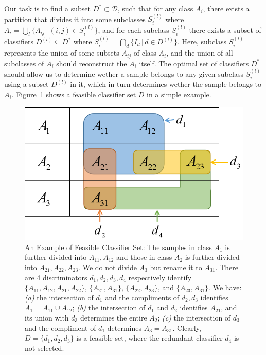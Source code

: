 \documentclass[acmsmall,nonacm]{acmart}\settopmatter{}
\begin{document}
Our task is to find a subset $D^* \subset \mathcal{D}$, such that for any class $A_i$, there exists a partition that divides it into some subclasses $S_i^{(l)}$ where $A_i = \bigcup_l \{A_{ij} \,|\, (i, j) \in S_i^{(l)}\}$, and for each subclass $S_i^{(l)}$ there exists a subset of classifiers $D^{(l)} \subseteq D^*$ where $S_i^{(l)} = \bigcap_d \{I_d \,|\, d \in D^{(l)}\}$.
Here, subclass $S_i^{(l)}$ represents the union of some subsets $A_{ij}$ of class $A_i$, and the union of all subclasses of $A_i$ should reconstruct the $A_i$ itself.
The optimal set of classifiers $D^*$ should allow us to determine wether a sample belongs to any given subclass $S_i^{(l)}$ using a subset $D^{(l)}$ in it, which in turn determines wether the sample belongs to $A_i$.
Figure~\ref{fig:feasible-example} shows a feasible classifier set $D$ in a simple example.

\begin{figure}[h]
    \centering
    \includegraphics[width=0.45\linewidth]{fig/formulation_example.png}
    \caption{An Example of Feasible Classifier Set:
    The samples in class $A_1$ is further divided into $A_{11}, A_{12}$ and those in class $A_2$ is further divided into $A_{21}, A_{22}, A_{23}$.
    We do not divide $A_3$ but rename it to $A_{31}$.
    There are 4 discriminators $d_1, d_2, d_3, d_4$ respectively identify $\{A_{11}, A_{12}, A_{21}, A_{22}\}$, $\{A_{21}, A_{31}\}$, $\{A_{22}, A_{23}\}$, and $\{A_{23}, A_{31}\}$.
    We have: \textit{(a)} the intersection of $d_1$ and the compliments of $d_2, d_3$ identifies $A_1 = A_{11} \cup A_{12}$;
    \textit{(b)} the intersection of $d_1$ and $d_2$ identifies $A_{21}$, and its union with $d_3$ determines the entire $A_2$;
    \textit{(c)} the intersection of $d_3$ and the compliment of $d_1$ determines $A_3 = A_{31}$.
    Clearly, $D = \{d_1, d_2, d_3\}$ is a feasible set, where the redundant classifier $d_4$ is not selected.}
    \label{fig:feasible-example}
\end{figure}
\end{document}
